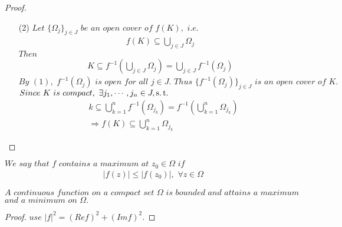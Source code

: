 \begin{proposition}
\begin{proof}
\begin{enumerate}
			\item[(2)]$Let \,\, \{ \Omega_j \}_{j \in J} \,\, be \,\, an \,\, open \,\, cover \,\, of \,\, f(K) , \,\, i.e.$
			\begin{align}
				f(K) \subseteq \bigcup_{j \in J}{\Omega_j}
			\end{align}
			$Then$
			\begin{align}
				K \subseteq f^{-1}(\bigcup_{j \in J}{\Omega_j}) = \bigcup_{j \in J}{f^{-1}(\Omega_j)}
			\end{align}
			$By \,\, (1) , \,\, f^{-1}(\Omega_j) \,\, is \,\, open \,\, for \,\, all \,\, j \in J. \,\, Thus \,\, \{ f^{-1}(\Omega_j) \}_{j \in J} \,\, is \,\, an \,\, open \,\, cover \,\, of \,\, K.$\\
			$Since \,\, K \,\, is \,\, compact , \,\, \exists j_1 , \cdots , j_n \in J , \operatorname{s.t.} $
			\begin{align}
				&k \subseteq \bigcup_{k = 1}^{n}{f^{-1}(\Omega_{j_k})} = f^{-1}(\bigcup_{k = 1}^{n}{\Omega_{j_k}}) \\
				&\Rightarrow f(K) \subseteq \bigcup_{k = 1}^{n}{\Omega_{j_k}}
			\end{align}
		\end{enumerate}
	\end{proof}
\end{proposition}

\vspace*{2em}
$We \,\, say \,\, that \,\, f \,\, contains \,\, a \,\, maximum \,\, at \,\, z_0 \in \Omega \,\, if $
\begin{align}
	\left| f(z) \right| \leq \left| f(z_0) \right| , \,\, \forall z \in \Omega
\end{align}

\begin{proposition}\label{prop 2.1.2}
	$A \,\, continuous \,\, function \,\, on \,\, a \,\, compact \,\, set \,\, \Omega \,\, is \,\, bounded \,\, and \,\, attains \,\, a \,\, maximum $\\ 
	$and \,\, a \,\, minimum \,\, on \,\, \Omega.$
	
	\vspace*{2em}
	\begin{proof}
		$use \,\, \left| f \right|^2 = (Ref)^2 + (Imf)^2$.
	\end{proof}
\end{proposition}

\newpage
